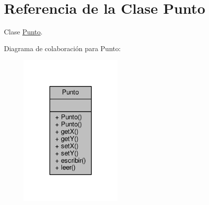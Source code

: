 \hypertarget{classPunto}{}\section{Referencia de la Clase Punto}
\label{classPunto}


Clase \hyperlink{classPunto}{Punto}.  




Diagrama de colaboración para Punto\+:\nopagebreak
\begin{figure}[H]
\begin{center}
\leavevmode
\includegraphics[width=143pt]{classPunto__coll__graph}
\end{center}
\end{figure}
